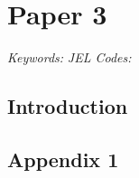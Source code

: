 \chapter{Paper 3}

\begin{abstract}
\end{abstract}

\noindent   \textit{Keywords:}      \newline
            \textit{JEL Codes:}



\pagebreak
\section{Introduction}



\pagebreak





\pagebreak
\begin{subappendices}

\section{Appendix 1}

\end{subappendices}